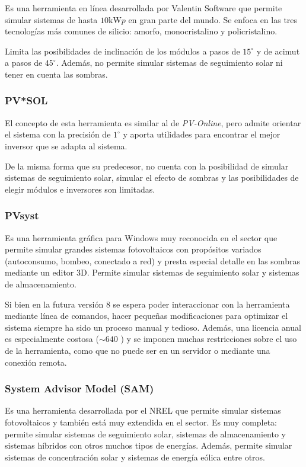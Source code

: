Es una herramienta en línea desarrollada por Valentin Software que permite simular sistemas de hasta $10 \si{\kilo\watt}p$ en gran parte del mundo. Se enfoca en las tres tecnologías más comunes de silicio: amorfo, monocristalino y policristalino.

Limita las posibilidades de inclinación de los módulos a pasos de $15^\circ$ y de acimut a pasos de $45^\circ$. Además, no permite simular sistemas de seguimiento solar ni tener en cuenta las sombras.

\subsubsection{PV*SOL}

El concepto de esta herramienta es similar al de \textit{PV-Online}, pero admite orientar el sistema con la precisión de $1^\circ$ y aporta utilidades para encontrar el mejor \gls{inversor} que se adapta al sistema.

De la misma forma que su predecesor, no cuenta con la posibilidad de simular sistemas de seguimiento solar, simular el efecto de sombras y las posibilidades de elegir módulos e inversores son limitadas.

\subsubsection{PVsyst}

Es una herramienta gráfica para Windows muy reconocida en el sector que permite simular grandes sistemas fotovoltaicos con propósitos variados (autoconsumo, bombeo, conectado a red) y presta especial detalle en las sombras mediante un editor 3D. Permite simular sistemas de seguimiento solar y sistemas de almacenamiento.

Si bien en la futura versión 8 se espera poder interaccionar con la herramienta mediante línea de comandos, hacer pequeñas modificaciones para optimizar el sistema siempre ha sido un proceso manual y tedioso. Además, una licencia anual es especialmente costosa ($\sim 640 $ \texteuro) y se imponen muchas restricciones sobre el uso de la herramienta, como que no puede ser en un servidor o mediante una conexión remota.

\subsubsection{System Advisor Model (SAM)}

Es una herramienta desarrollada por el \gls{NREL} que permite simular sistemas fotovoltaicos y también está muy extendida en el sector. Es muy completa: permite simular sistemas de seguimiento solar, sistemas de almacenamiento y sistemas híbridos con otros muchos tipos de energías. Además, permite simular sistemas de concentración solar y sistemas de energía eólica entre otros.

